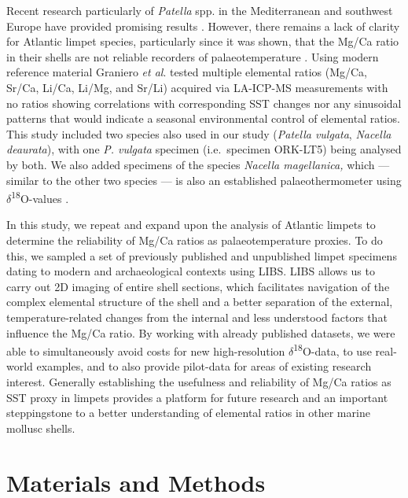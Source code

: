 \documentclass[
  authoryear,
  preprint,
  3p]{elsarticle}
\begin{document}
Recent research particularly of \emph{Patella} spp. in the Mediterranean
and southwest Europe have provided promising results
\citep{Hausmann2019-fi, Garcia-Escarzaga2015-jc, Garcia-Escarzaga2018-nf}.
However, there remains a lack of clarity for Atlantic limpet species,
particularly since it was shown, that the Mg/Ca ratio in their shells
are not reliable recorders of palaeotemperature \citep{Graniero2017-io}.
Using modern reference material Graniero \emph{et al}.
\citeyearpar{Graniero2017-io} tested multiple elemental ratios (Mg/Ca,
Sr/Ca, Li/Ca, Li/Mg, and Sr/Li) acquired via LA-ICP-MS measurements with
no ratios showing correlations with corresponding SST changes nor any
sinusoidal patterns that would indicate a seasonal environmental control
of elemental ratios. This study included two species also used in our
study (\emph{Patella vulgata}, \emph{Nacella deaurata}), with one
\emph{P. vulgata} specimen (i.e.~specimen ORK-LT5) being analysed by
both. We also added specimens of the species \emph{Nacella magellanica,}
which --- similar to the other two species --- is also an established
palaeothermometer using \(\delta\)\textsuperscript{18}O-values
\citep{Colonese2012-ct, gutiérrez-zugasti2017, Nicastro2020-ih}.

In this study, we repeat and expand upon the analysis of Atlantic
limpets to determine the reliability of Mg/Ca ratios as
palaeotemperature proxies. To do this, we sampled a set of previously
published and unpublished limpet specimens dating to modern and
archaeological contexts using LIBS. LIBS allows us to carry out 2D
imaging of entire shell sections, which facilitates navigation of the
complex elemental structure of the shell and a better separation of the
external, temperature-related changes from the internal and less
understood factors that influence the Mg/Ca ratio. By working with
already published datasets, we were able to simultaneously avoid costs
for new high-resolution \(\delta\)\textsuperscript{18}O-data, to use
real-world examples, and to also provide pilot-data for areas of
existing research interest. Generally establishing the usefulness and
reliability of Mg/Ca ratios as SST proxy in limpets provides a platform
for future research and an important steppingstone to a better
understanding of elemental ratios in other marine mollusc shells.

\section{Materials and Methods}\label{Methods}
\end{document}
